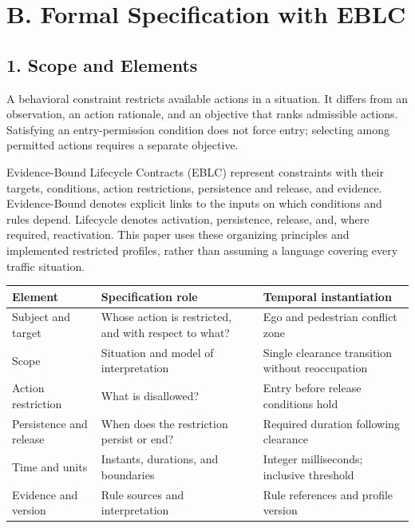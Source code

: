 \documentclass[11pt,a4paper]{article}
\begin{document}
\section*{B. Formal Specification with EBLC}

\subsection*{1. Scope and Elements}

A behavioral constraint restricts available actions in a situation. It differs from an observation, an action rationale, and an objective that ranks admissible actions. Satisfying an entry-permission condition does not force entry; selecting among permitted actions requires a separate objective.\par

Evidence-Bound Lifecycle Contracts (EBLC) represent constraints with their targets, conditions, action restrictions, persistence and release, and evidence. Evidence-Bound denotes explicit links to the inputs on which conditions and rules depend. Lifecycle denotes activation, persistence, release, and, where required, reactivation. This paper uses these organizing principles and implemented restricted profiles, rather than assuming a language covering every traffic situation.\par

\par\medskip\noindent\begin{minipage}{\linewidth}\small
\begin{tabular}{@{}>{\raggedright\arraybackslash}p{}>{\raggedright\arraybackslash}p{}>{\raggedright\arraybackslash}p{}@{}}
\toprule
\textbf{Element} & \textbf{Specification role} & \textbf{Temporal instantiation} \\
\midrule
Subject and target & Whose action is restricted, and with respect to what? & Ego and pedestrian conflict zone \\
Scope & Situation and model of interpretation & Single clearance transition without reoccupation \\
Action restriction & What is disallowed? & Entry before release conditions hold \\
Persistence and release & When does the restriction persist or end? & Required duration following clearance \\
Time and units & Instants, durations, and boundaries & Integer milliseconds; inclusive threshold \\
Evidence and version & Rule sources and interpretation & Rule references and profile version \\
\bottomrule\end{tabular}\end{minipage}\par\medskip
\end{document}
